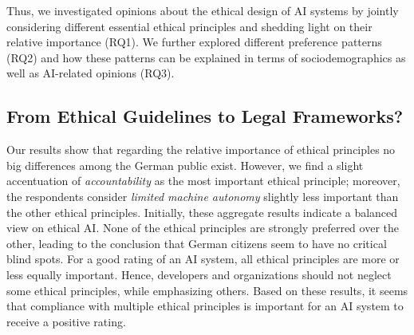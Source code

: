 \documentclass{article}
\begin{document}
Thus, we investigated opinions about the ethical design of AI systems by
jointly considering different essential ethical principles and shedding
light on their relative importance (RQ1). We further explored different
preference patterns (RQ2) and how these patterns can be explained in
terms of sociodemographics as well as AI-related opinions (RQ3).

\hypertarget{from-ethical-guidelines-to-legal-frameworks}{%
\subsection{From Ethical Guidelines to Legal
Frameworks?}\label{from-ethical-guidelines-to-legal-frameworks}}

Our results show that regarding the relative importance of ethical
principles no big differences among the German public exist. However, we
find a slight accentuation of \emph{accountability} as the most
important ethical principle; moreover, the respondents consider
\emph{limited machine autonomy} slightly less important than the other
ethical principles. Initially, these aggregate results indicate a
balanced view on ethical AI. None of the ethical principles are strongly
preferred over the other, leading to the conclusion that German citizens
seem to have no critical blind spots. For a good rating of an AI system,
all ethical principles are more or less equally important. Hence,
developers and organizations should not neglect some ethical principles,
while emphasizing others. Based on these results, it seems that
compliance with multiple ethical principles is important for an AI
system to receive a positive rating.
\end{document}

